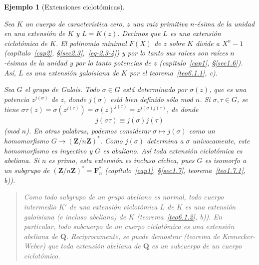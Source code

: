 \documentclass[bibtotoc,leqno,spanish]{amsbook}
\newcommand{\QQ}{\mathbf{Q}}
\newcommand{\ZZ}{\mathbf{Z}}
\newcommand{\FF}{\mathbf{F}}
\renewcommand{\to}[1][]{\xrightarrow{#1}}
\numberwithin{equation}{section}
\newenvironment{comm}%
	{\begin{quotation}\itshape\Small}
	{\end{quotation}}
\theoremstyle{note}
\theoremstyle{note}
\theoremstyle{rem}
\newtheorem{example}{Ejemplo}
\numberwithin{theorem}{section}
\numberwithin{proposition}{section}
\numberwithin{definition}{section}
\numberwithin{lemma}{section}
\numberwithin{corollary}{section}
\numberwithin{example}{section}
\numberwithin{footnote}{section}%
\begin{document}
\begin{example}[Extensiones ciclot\'omicas]\label{ej6.1.2}

Sea $K$ un cuerpo de caracter\'istica cero, $z$ una ra\'iz primitiva $n$-\'esima de
la unidad en una
extensi\'on de $K$ y $L=K(z)$. Decimos que $L$ es una extensi\'on {\em ciclot\'omica}
de $K$. El polinomio
minimal $F(X)$ de $z$ sobre $K$ divide a $X^{n}-1$
(cap\'itulo~\ref{cap2}, \S\ref{sec2.3},~\eqref{eq-2.3-4}) y por lo tanto
sus ra\'ices son ra\'ices $n$-\'esimas de la unidad y por lo tanto potencias
de $z$ (cap\'itulo~\ref{cap1}, \S\ref{sec1.6}).
As\'i, $L$ es una extensi\'on {\em galoisiana} de $K$ por el
teorema~\ref{teo6.1.1}, {\itshape c}).

Sea $G$ el grupo de Galois. Todo $\sigma\in G$ est\'a determinado por $\sigma(z)$,
que es una potencia
$z^{j(\sigma)}$ de $z$, donde $j(\sigma)$ est\'a bien definido s\'olo mod $n$.
Si $\sigma,\tau\in G$, se tiene
$\sigma\tau(z) = \sigma(z^{j(\tau)}) = \sigma(z)^{j(\tau)} = z^{j(\sigma)j(\tau)}$, de donde
\begin{gather*}
j(\sigma\tau) \equiv j(\sigma)j(\tau)
\end{gather*}
(mod $n$). En otras palabras, podemos considerar $\sigma\mapsto j(\sigma)$ como
un {\em homomorfismo}
$G\to(\ZZ/n\ZZ)^{*}$. Como $j(\sigma)$ determina a $\sigma$ un\'ivocamente, este
homomorfismo es {\em inyectivo}
y $G$ es abaliano. As\'i {\em toda extensi\'on ciclot\'omica es abeliana.} Si $n$ es
primo, esta extensi\'on
es incluso {\em c\'iclica,} pues $G$ es isomorfo a un subgrupo de
$(\ZZ/n\ZZ)^{*} = \FF_{n}^{*}$ (cap\'itulo~\ref{cap1},
\S\ref{sec1.7}, teorema~\ref{teo1.7.1}, {\itshape b})).
\end{example}

\begin{comm}
Como todo subgrupo de un grupo abeliano es normal, todo cuerpo intermedio $K'$ de
una extensi\'on ciclot\'omica
$L$ de $K$ es una extensi\'on galoisiana (e incluso abeliana) de $K$
(teorema~\ref{teo6.1.2}, {\itshape b})). En particular, todo
subcuerpo de un cuerpo ciclot\'omica es una extensi\'on abeliana de $\QQ$. Reciprocamente,
se puede
demostrar (teorema de Kronecker-Weber) que toda extensi\'on abeliana de $\QQ$ es un
subcuerpo de un cuerpo ciclot\'omico.
\end{comm}
\end{document}
